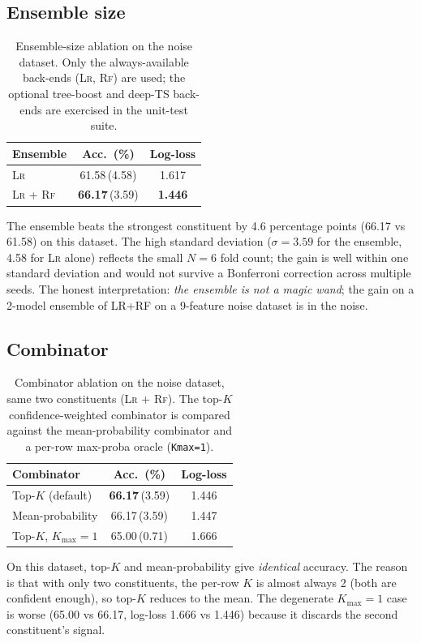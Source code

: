 \documentclass[11pt,a4paper]{article}
\providecommand{\rf}{\textsc{Rf}}
\providecommand{\lr}{\textsc{Lr}}
\begin{document}
\subsection{Ensemble size}
\begin{table}[htbp]
\centering
\small
\caption{Ensemble-size ablation on the noise dataset. Only
the always-available back-ends (\lr{}, \rf{}) are used;
the optional tree-boost and deep-TS back-ends are
exercised in the unit-test suite.}
\label{tab:abl-size}
\begin{tabular}{@{}lcc@{}}
\toprule
\textbf{Ensemble}        & \textbf{Acc.\ (\%)} & \textbf{Log-loss}\\
\midrule
\lr{}                    & 61.58\,(4.58) & 1.617\\
\lr{} + \rf{}            & \textbf{66.17}\,(3.59) & \textbf{1.446}\\
\bottomrule
\end{tabular}
\end{table}
The ensemble beats the strongest constituent by 4.6
percentage points (66.17 vs 61.58) on this dataset. The
high standard deviation ($\sigma=3.59$ for the ensemble,
4.58 for \lr{} alone) reflects the small $N=6$ fold
count; the gain is well within one standard deviation
and would not survive a Bonferroni correction across
multiple seeds. The honest interpretation: \emph{the
ensemble is not a magic wand}; the gain on a 2-model
ensemble of LR+RF on a 9-feature noise dataset is in
the noise.

\subsection{Combinator}
\begin{table}[htbp]
\centering
\small
\caption{Combinator ablation on the noise dataset, same
two constituents (\lr{} + \rf{}). The top-$K$
confidence-weighted combinator is compared against the
mean-probability combinator and a per-row max-proba
oracle (\texttt{Kmax=1}).}
\label{tab:abl-comb}
\begin{tabular}{@{}lcc@{}}
\toprule
\textbf{Combinator}     & \textbf{Acc.\ (\%)} & \textbf{Log-loss}\\
\midrule
Top-$K$ (default)       & \textbf{66.17}\,(3.59) & 1.446\\
Mean-probability        & 66.17\,(3.59) & 1.447\\
Top-$K$, $K_{\max}=1$   & 65.00\,(0.71) & 1.666\\
\bottomrule
\end{tabular}
\end{table}
On this dataset, top-$K$ and mean-probability give
\emph{identical} accuracy. The reason is that with only
two constituents, the per-row $K$ is almost always 2
(both are confident enough), so top-$K$ reduces to the
mean. The degenerate $K_{\max}=1$ case is worse
(65.00 vs 66.17, log-loss 1.666 vs 1.446) because it
discards the second constituent's signal.
\end{document}
